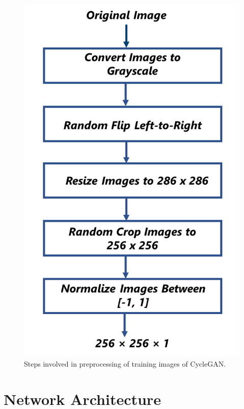 \begin{figure}[H]
        \begin{center}
	    \includegraphics[scale=0.40]{images/Preprocessing.png}
	    \caption[Steps involved in preprocessing of training images of \ac{CycleGAN}.]{Steps involved in preprocessing of training images of \ac{CycleGAN}.}
	    \label{fig:Preprocessing}
	    \end{center}
\end{figure}


\section{Network Architecture}\label{NetworkArchitecture}

